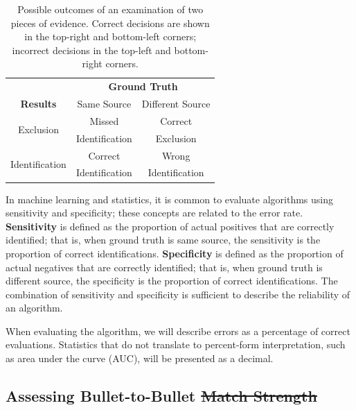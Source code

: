 \documentclass[doubleblind]{elsarticle}\usepackage[]{graphicx}\usepackage[]{color}
\providecommand{\DIFaddtex}[1]{{\protect\color{blue}\uwave{#1}}} %
\providecommand{\DIFdeltex}[1]{{\protect\color{red}\sout{#1}}}                      %
\providecommand{\DIFaddbegin}{} %
\providecommand{\DIFaddend}{} %
\providecommand{\DIFdelbegin}{} %
\providecommand{\DIFdelend}{} %
\providecommand{\DIFadd}[1]{\texorpdfstring{\DIFaddtex{#1}}{#1}} %
\providecommand{\DIFdel}[1]{\texorpdfstring{\DIFdeltex{#1}}{}} %
\newcommand{\DIFscaledelfig}{0.5}
\newlength{\DIFdelgraphicswidth} %
\newlength{\DIFdelgraphicsheight} %
\newcommand{\DIFaddincludegraphics}[2][]{{\color{blue}\fbox{\DIFOincludegraphics[#1]{#2}}}} %
\newcommand{\DIFdelincludegraphics}[2][]{%
\sbox{\DIFdelgraphicsbox}{\DIFOincludegraphics[#1]{#2}}%
\settoboxwidth{\DIFdelgraphicswidth}{\DIFdelgraphicsbox} %
\settoboxtotalheight{\DIFdelgraphicsheight}{\DIFdelgraphicsbox} %
\scalebox{\DIFscaledelfig}{%
\parbox[b]{\DIFdelgraphicswidth}{\usebox{\DIFdelgraphicsbox}\\[-\baselineskip] \rule{\DIFdelgraphicswidth}{0em}}\llap{\resizebox{\DIFdelgraphicswidth}{\DIFdelgraphicsheight}{%
\setlength{\unitlength}{\DIFdelgraphicswidth}%
\begin{picture}(1,1)%
\thicklines\linethickness{2pt} %
{\color[rgb]{1,0,0}\put(0,0){\framebox(1,1){}}}%
{\color[rgb]{1,0,0}\put(0,0){\line( 1,1){1}}}%
{\color[rgb]{1,0,0}\put(0,1){\line(1,-1){1}}}%
\end{picture}%
}\hspace*{3pt}}} %
} %
\DeclareRobustCommand{\DIFaddbegin}{\DIFOaddbegin \let\includegraphics\DIFaddincludegraphics} %
\DeclareRobustCommand{\DIFaddend}{\DIFOaddend \let\includegraphics\DIFOincludegraphics} %
\DeclareRobustCommand{\DIFdelbegin}{\DIFOdelbegin \let\includegraphics\DIFdelincludegraphics} %
\DeclareRobustCommand{\DIFdelend}{\DIFOaddend \let\includegraphics\DIFOincludegraphics} %
\begin{document}
\begin{table}
\centering
\bgroup
\def\arraystretch{.8}%
\begin{tabular}{|ccc}
\multicolumn{1}{c}{} & \multicolumn{2}{c}{\textbf{Ground Truth}}\\\cline{2-3}
\multicolumn{1}{c}{\textbf{Results}} & \multicolumn{1}{|c}{Same Source} & \multicolumn{1}{|c|}{Different Source} \\\hline
\multirow{2}{*}{Exclusion} & \multicolumn{1}{|c}{Missed} & \multicolumn{1}{|c|}{Correct}\\
   &  \multicolumn{1}{|c}{Identification} & \multicolumn{1}{|c|}{Exclusion}\\\hline
\multirow{2}{*}{Identification}  &  \multicolumn{1}{|c}{Correct} & \multicolumn{1}{|c|}{Wrong}\\
   &  \multicolumn{1}{|c}{Identification} & \multicolumn{1}{|c|}{Identification}\\\hline
\end{tabular}
\egroup
\caption{Possible outcomes of an examination of two pieces of evidence. Correct decisions are shown in the top-right and bottom-left corners; incorrect decisions in the top-left and bottom-right corners.\label{tab:possible-outcomes}}
\end{table}


In machine learning and statistics, it is common to evaluate algorithms using sensitivity and specificity; these concepts are related to the error rate. \textbf{Sensitivity} is defined as the proportion of actual positives that are correctly identified; that is, when ground truth is same source, the sensitivity is the proportion of correct identifications. \textbf{Specificity} is defined as the proportion of actual negatives that are correctly identified; that is, when ground truth is different source, the specificity is the proportion of correct identifications. The combination of sensitivity and specificity is sufficient to describe the reliability of an algorithm. 

When evaluating the \citet{aoas2} algorithm, we will describe errors as a percentage of correct evaluations. Statistics that do not translate to percent-form interpretation, such as area under the curve (AUC), will be presented as a decimal. 

\subsection{Assessing Bullet-to-Bullet \DIFdelbegin \DIFdel{Match Strength}\DIFdelend \DIFaddbegin \DIFadd{Similarity}\DIFaddend }
\end{document}
